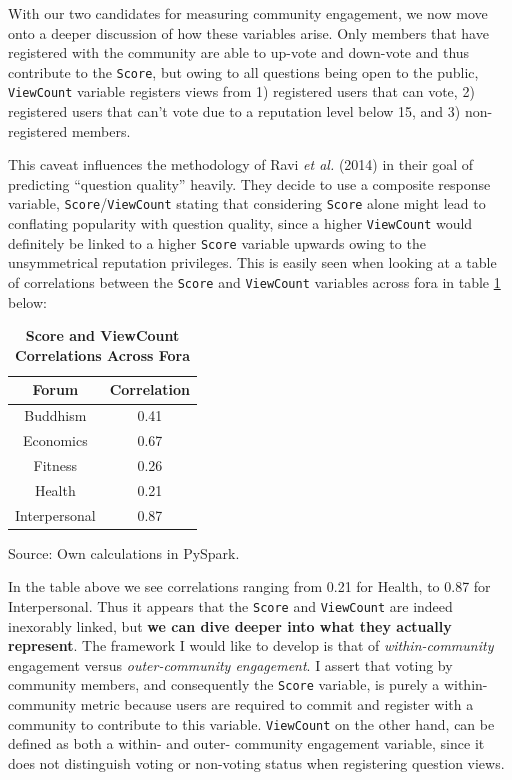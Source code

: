 \documentclass[11pt,preprint, authoryear]{article}
\numberwithin{equation}{section}
\begin{document}
With our two candidates for measuring community engagement, we now move
onto a deeper discussion of how these variables arise. Only members that
have registered with the community are able to up-vote and down-vote and
thus contribute to the \texttt{Score}, but owing to all questions being
open to the public, \texttt{ViewCount} variable registers views from 1)
registered users that can vote, 2) registered users that can't vote due
to a reputation level below 15, and 3) non-registered members.

This caveat influences the methodology of Ravi \emph{et al.} (2014) in
their goal of predicting ``question quality'' heavily. They decide to
use a composite response variable, \texttt{Score}/\texttt{ViewCount}
stating that considering \texttt{Score} alone might lead to conflating
popularity with question quality, since a higher \texttt{ViewCount}
would definitely be linked to a higher \texttt{Score} variable upwards
owing to the unsymmetrical reputation privileges. This is easily seen
when looking at a table of correlations between the \texttt{Score} and
\texttt{ViewCount} variables across fora in table \ref{tab:corr} below:

\footnotesize

\begin{longtable} {@{} cc @{}}
\caption{\textbf{Score and ViewCount Correlations Across Fora}}
\label{tab:corr}\\ 
\toprule
\textbf{Forum} & \textbf{Correlation} \\ 
\midrule
Buddhism & 0.41 \\
Economics & 0.67 \\
Fitness & 0.26 \\
Health & 0.21 \\
Interpersonal & 0.87 \\
\bottomrule
\end{longtable}\begin{center} Source: Own calculations in PySpark.\end{center}

\normalsize

In the table above we see correlations ranging from 0.21 for Health, to
0.87 for Interpersonal. Thus it appears that the \texttt{Score} and
\texttt{ViewCount} are indeed inexorably linked, but \textbf{we can dive
deeper into what they actually represent}. The framework I would like to
develop is that of \emph{within-community} engagement versus
\emph{outer-community engagement}. I assert that voting by community
members, and consequently the \texttt{Score} variable, is purely a
within-community metric because users are required to commit and
register with a community to contribute to this variable.
\texttt{ViewCount} on the other hand, can be defined as both a within-
and outer- community engagement variable, since it does not distinguish
voting or non-voting status when registering question views.
\end{document}
